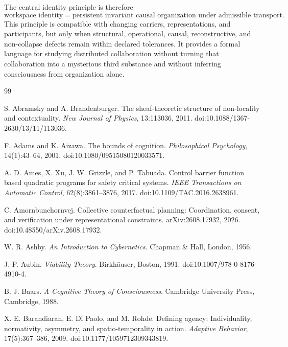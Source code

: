 \documentclass[11pt,letterpaper]{article}
\theoremstyle{plain}
\theoremstyle{definition}
\begin{document}
The central identity principle is therefore
\[
\boxed{
\text{workspace identity}
=
\text{persistent invariant causal organization under admissible transport}.
}
\]
This principle is compatible with changing carriers, representations, and participants, but only when
structural, operational, causal, reconstructive, and non-collapse defects remain within declared tolerances.
It provides a formal language for studying distributed collaboration without turning that collaboration
into a mysterious third substance and without inferring consciousness from organization alone.

\begin{thebibliography}{99}
\small

S. Abramsky and A. Brandenburger.
\newblock The sheaf-theoretic structure of non-locality and contextuality.
\newblock \emph{New Journal of Physics}, 13:113036, 2011.
\newblock doi:10.1088/1367-2630/13/11/113036.

F. Adams and K. Aizawa.
\newblock The bounds of cognition.
\newblock \emph{Philosophical Psychology}, 14(1):43--64, 2001.
\newblock doi:10.1080/09515080120033571.

A. D. Ames, X. Xu, J. W. Grizzle, and P. Tabuada.
\newblock Control barrier function based quadratic programs for safety critical systems.
\newblock \emph{IEEE Transactions on Automatic Control}, 62(8):3861--3876, 2017.
\newblock doi:10.1109/TAC.2016.2638961.

C. Amornbunchornvej.
\newblock Collective counterfactual planning: Coordination, consent, and verification under representational constraints.
\newblock arXiv:2608.17932, 2026.
\newblock doi:10.48550/arXiv.2608.17932.

W. R. Ashby.
\newblock \emph{An Introduction to Cybernetics}.
\newblock Chapman \& Hall, London, 1956.

J.-P. Aubin.
\newblock \emph{Viability Theory}.
\newblock Birkh\"auser, Boston, 1991.
\newblock doi:10.1007/978-0-8176-4910-4.

B. J. Baars.
\newblock \emph{A Cognitive Theory of Consciousness}.
\newblock Cambridge University Press, Cambridge, 1988.

X. E. Barandiaran, E. Di Paolo, and M. Rohde.
\newblock Defining agency: Individuality, normativity, asymmetry, and spatio-temporality in action.
\newblock \emph{Adaptive Behavior}, 17(5):367--386, 2009.
\newblock doi:10.1177/1059712309343819.


\end{thebibliography}
\end{document}
